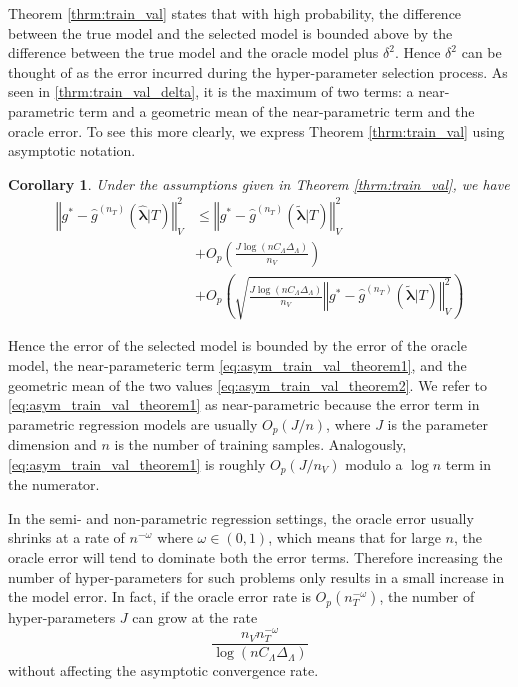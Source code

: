 \documentclass[12pt]{article}
\newtheorem{corollary}{Corollary}
\begin{document}
Theorem \ref{thrm:train_val} states that with high probability, the difference between the true model and the selected model is bounded above by the difference between the true model and the oracle model plus $\delta^2$. Hence $\delta^2$ can be thought of as the error incurred during the hyper-parameter selection process. As seen in \eqref{thrm:train_val_delta}, it is the maximum of two terms: a near-parametric term and a geometric mean of the near-parametric term and the oracle error. To see this more clearly, we express Theorem \ref{thrm:train_val} using asymptotic notation.
\begin{corollary}
	\label{corr:train_val}
	Under the assumptions given in Theorem \ref{thrm:train_val}, we have
	\begin{align}
	\left\Vert g^* - \hat{g}^{(n_T)}( \hat{\boldsymbol{\lambda}} | T) \right\Vert _{V}^2 &\le \left\Vert g^* - \hat{g}^{(n_T)}( \tilde{\boldsymbol{\lambda}} | T) \right \Vert^2_{V}\\
	& + O_p \left(\frac{J\log (n C_\Lambda \Delta_{\Lambda} )}{n_{V}} \right) 
	\label{eq:asym_train_val_theorem1} \\
	& + O_p \left(
	\sqrt{
		\frac{J \log (n C_\Lambda \Delta_{\Lambda} )}{n_{V}}
		\left\Vert g^* - \hat{g}^{(n_T)}( \tilde{\boldsymbol{\lambda}}| T) \right \Vert^2_{V}
	}
	\right )
	\label{eq:asym_train_val_theorem2}
	\end{align}
\end{corollary}
Hence the error of the selected model is bounded by the error of the oracle model, the near-parameteric term \eqref{eq:asym_train_val_theorem1}, and the geometric mean of the two values \eqref{eq:asym_train_val_theorem2}. We refer to \eqref{eq:asym_train_val_theorem1} as near-parametric because the error term in parametric regression models are usually $O_p(J/n)$, where $J$ is the parameter dimension and $n$ is the number of training samples. Analogously, \eqref{eq:asym_train_val_theorem1} is roughly $O_p(J/n_V)$ modulo a $\log n$ term in the numerator.

In the semi- and non-parametric regression settings, the oracle error usually shrinks at a rate of $n^{-\omega}$ where $\omega \in (0, 1)$, which means that for large $n$, the oracle error will tend to dominate both the error terms. Therefore increasing the number of hyper-parameters for such problems only results in a small increase in the model error. In fact, if the oracle error rate is $O_p(n_T^{-\omega})$, the number of hyper-parameters $J$ can grow at the rate
\begin{equation}
\frac{n_{V} n_T^{-\omega}}{\log (n C_\Lambda\Delta_{\Lambda})}
\end{equation}
without affecting the asymptotic convergence rate.
\end{document}
